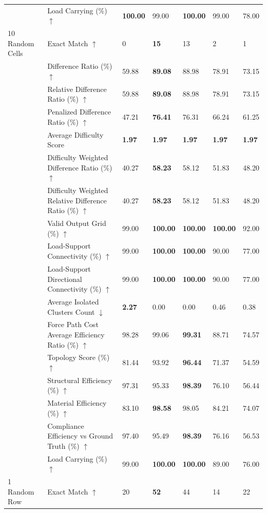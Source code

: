 \begin{table}[!h]
{\begin{tabular}{lllllll}
 & Load Carrying (\%) $\uparrow$ & \textbf{100.00} & 99.00 & \textbf{100.00} & 99.00 & 78.00 \\
10 Random Cells & Exact Match $\uparrow$ & 0 & \textbf{15} & 13 & 2 & 1 \\
 & Difference Ratio (\%) $\uparrow$ & 59.88 & \textbf{89.08} & 88.98 & 78.91 & 73.15 \\
 & Relative Difference Ratio (\%) $\uparrow$ & 59.88 & \textbf{89.08} & 88.98 & 78.91 & 73.15 \\
 & Penalized Difference Ratio (\%) $\uparrow$ & 47.21 & \textbf{76.41} & 76.31 & 66.24 & 61.25 \\
 & Average Difficulty Score & \textbf{1.97} & \textbf{1.97} & \textbf{1.97} & \textbf{1.97} & \textbf{1.97} \\
 & Difficulty Weighted Difference Ratio (\%) $\uparrow$ & 40.27 & \textbf{58.23} & 58.12 & 51.83 & 48.20 \\
 & Difficulty Weighted Relative Difference Ratio (\%) $\uparrow$ & 40.27 & \textbf{58.23} & 58.12 & 51.83 & 48.20 \\
 & Valid Output Grid (\%) $\uparrow$ & 99.00 & \textbf{100.00} & \textbf{100.00} & \textbf{100.00} & 92.00 \\
 & Load-Support Connectivity (\%) $\uparrow$ & 99.00 & \textbf{100.00} & \textbf{100.00} & 90.00 & 77.00 \\
 & Load-Support Directional Connectivity (\%) $\uparrow$ & 99.00 & \textbf{100.00} & \textbf{100.00} & 90.00 & 77.00 \\
 & Average Isolated Clusters Count $\downarrow$ & \textbf{2.27} & 0.00 & 0.00 & 0.46 & 0.38 \\
 & Force Path Cost Average Efficiency Ratio (\%) $\uparrow$ & 98.28 & 99.06 & \textbf{99.31} & 88.71 & 74.57 \\
 & Topology Score (\%) $\uparrow$ & 81.44 & 93.92 & \textbf{96.44} & 71.37 & 54.59 \\
 & Structural Efficiency (\%) $\uparrow$ & 97.31 & 95.33 & \textbf{98.39} & 76.10 & 56.44 \\
 & Material Efficiency (\%) $\uparrow$ & 83.10 & \textbf{98.58} & 98.05 & 84.21 & 74.07 \\
 & Compliance Efficiency vs Ground Truth (\%) $\uparrow$ & 97.40 & 95.49 & \textbf{98.39} & 76.16 & 56.53 \\
 & Load Carrying (\%) $\uparrow$ & 99.00 & \textbf{100.00} & \textbf{100.00} & 89.00 & 76.00 \\
1 Random Row & Exact Match $\uparrow$ & 20 & \textbf{52} & 44 & 14 & 22 \\

\end{tabular}}
\end{table}
